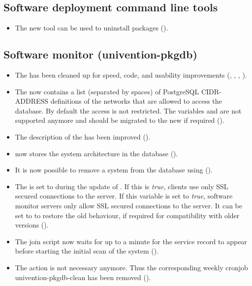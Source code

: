 \subsection{Software deployment command line tools}
\begin{itemize}
\item The new tool  can be used to
  uninstall packages ().
\end{itemize}


\subsection{Software monitor (univention-pkgdb)}
\begin{itemize}
\item The  has been cleaned up for speed,
  code, and usability improvements (, ,
  , ).

\item The  now contains a list
  (separated by spaces) of PostgreSQL CIDR-ADDRESS definitions of the
  networks that are allowed to access the 
  database. By default the access is not restricted. The
  \ucsUCR{} variables  and  are
  not supported anymore and should be migrated to the new
   if required ().

\item The description of the  has been improved
  ().

\item {} now stores the system architecture in
  the database ().

\item It is now possible to remove a system from the database using
   ().

\item The  is set to  during the
  update of . If this \ucsUCRV{} is
  \emph{true}, clients use only SSL secured
  connections to the server. If this variable is set to \emph{true},
  software monitor servers only allow SSL secured
  connections to the server. It can be set to  to
  restore the old behaviour, if required for compatibility with older
  \ucsUCS{} versions ().

\item The join script now waits for up to a minute for the service
  record to appear before starting the initial scan of the system
  ().

\item The  action is not necessary anymore. Thus the
  corresponding weekly cronjob univention-pkgdb-clean has been removed
  ().
\end{itemize}


